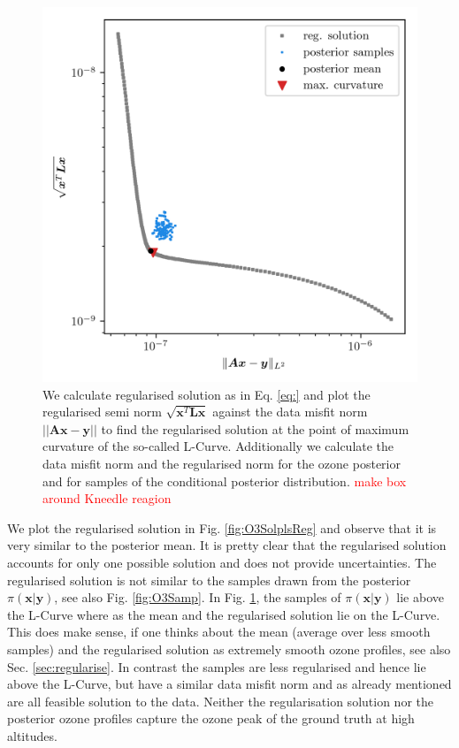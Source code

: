 \begin{figure}[ht!]
	\centering
	\includegraphics{LCurvePhD.png}
	\caption[Plot of the L-curve to find the regularised solution.]{We calculate regularised solution as in Eq. \ref{eq:} and plot the regularised semi norm $\sqrt{\bm{x}^T\bm{Lx}}$ against the data misfit norm $||\bm{Ax} -\bm{y} ||$ to find the regularised solution at the point of maximum curvature of the so-called L-Curve. Additionally we calculate the data misfit norm and the regularised norm for the ozone posterior and for samples of the conditional posterior distribution. \textcolor{red}{make box around Kneedle reagion}}
	\label{fig:LCurve}
\end{figure}

We plot the regularised solution in Fig. \ref{fig:O3SolplsReg} and observe that it is very similar to the posterior mean.
It is pretty clear that the regularised solution accounts for only one possible solution and does not provide uncertainties. The regularised solution is not similar to the samples drawn from the posterior $\pi(\bm{x}| \bm{y})$, see also Fig. \ref{fig:O3Samp}.
In Fig. \ref{fig:LCurve}, the samples of $\pi(\bm{x}| \bm{y})$ lie above the L-Curve where as the mean and the regularised solution lie on the L-Curve.
This does make sense, if one thinks about the mean (average over less smooth samples) and the regularised solution as extremely smooth ozone profiles, see also Sec. \ref{sec:regularise}.
In contrast the samples are less regularised and hence lie above the L-Curve, but have a similar data misfit norm and as already mentioned are all feasible solution to the data.
Neither the regularisation solution nor the posterior ozone profiles capture the ozone peak of the ground truth at high altitudes.
\clearpage

